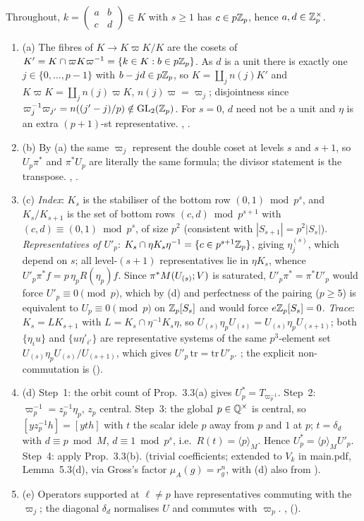 \begin{outline}
Throughout, $k=(\begin{smallmatrix}a&b\\c&d\end{smallmatrix})\in K$ with $s\ge1$ has $c\in p\mathbb{Z}_p$, hence $a,d\in\mathbb{Z}_p^\times$.
\begin{enumerate}[label=(\arabic*)]
\item (a) The fibres of $K\to K\varpi K/K$ are the cosets of $K'=K\cap\varpi K\varpi^{-1}=\{k\in K:b\in p\mathbb{Z}_p\}$. As $d$ is a unit there is exactly
one $j\in\{0,\dots,p-1\}$ with $b-jd\in p\mathbb{Z}_p$, so $K=\coprod_jn(j)K'$ and $K\varpi K=\coprod_jn(j)\varpi K$, $n(j)\varpi=\varpi_j$; disjointness since
$\varpi_j^{-1}\varpi_{j'}=n((j'-j)/p)\notin\mathrm{GL}_2(\mathbb{Z}_p)$. For $s=0$, $d$ need not be a unit and $\eta$ is an extra $(p+1)$-st representative.
\stproved, \stformal.
\item (b) By (a) the same $\varpi_j$ represent the double coset at levels $s$ and $s+1$, so $U_p\pi^*$ and $\pi^*U_p$ are literally the same
formula; the divisor statement is the transpose. \stproved, \stformal.
\item (c) \emph{Index}: $K_s$ is the stabiliser of the bottom row $(0,1)\bmod p^s$, and $K_s/K_{s+1}$ is the set of bottom rows
$(c,d)\bmod p^{s+1}$ with $(c,d)\equiv(0,1)\bmod p^s$, of size $p^2$ (consistent with $|S_{s+1}|=p^2|S_s|$). \emph{Representatives of $U'_p$}:
$K_s\cap\eta K_s\eta^{-1}=\{c\in p^{s+1}\mathbb{Z}_p\}$, giving $\eta_j^{(s)}$, which depend on $s$; all level-$(s+1)$ representatives lie in $\eta K_s$,
whence $U'_p\pi^*f=p\,\eta_p R(\eta_p)f$. Since $\pi^*M(U_{(s)};V)$ is saturated, $U'_p\pi^*=\pi^*U'_p$ would force $U'_p\equiv0\pmod p$, which
by (d) and perfectness of the pairing ($p\ge5$) is equivalent to $U_p\equiv0\pmod p$ on $\mathbb{Z}_p[S_s]$ and would force $e\mathbb{Z}_p[S_s]=0$.
\emph{Trace}: $K_s=LK_{s+1}$ with $L=K_s\cap\eta^{-1}K_s\eta$, so $U_{(s)}\eta_pU_{(s)}=U_{(s)}\eta_pU_{(s+1)}$; both $\{\eta_iu\}$ and $\{u\eta'_{i'}\}$ are
representative systems of the same $p^3$-element set $U_{(s)}\eta_pU_{(s)}/U_{(s+1)}$, which gives $U'_p\,\mathrm{tr}=\mathrm{tr}\,U'_p$. \stproved;
the explicit non-commutation is \stcomp{} ().
\item (d) Step~1: the orbit count of Prop.~3.3(a) gives $U_p^*=T_{\varpi_p^{-1}}$. Step~2: $\varpi_p^{-1}=z_p^{-1}\eta_p$, $z_p$ central. Step~3: the
global $p\in\mathbb{Q}^\times$ is central, so $[yz_p^{-1}h]=[yth]$ with $t$ the scalar idele $p$ away from $p$ and $1$ at $p$; $t=\delta_d$ with $d\equiv p\bmod M$,
$d\equiv1\bmod p^s$, i.e.\ $R(t)=\langle p\rangle_M$. Hence $U_p^*=\langle p\rangle_MU'_p$. Step~4: apply Prop.~3.3(b). \stproved{} (trivial
coefficients; extended to $V_k$ in main.pdf, Lemma~5.3(d), via Gross's factor $\mu_A(g)=r_g^n$, \stproved{} with (d) also \stcited{}
from \cite[Prop.~6.9]{Gr99}).
\item (e) Operators supported at $\ell\ne p$ have representatives commuting with the $\varpi_j$; the diagonal $\delta_d$ normalises $U$ and
commutes with $\varpi_p$. \stproved, \stformal{} ().
\end{enumerate}
\end{outline}

